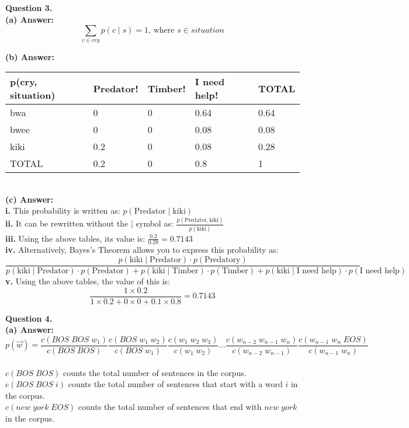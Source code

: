 \documentclass{article}
\begin{document}
\noindent
\textbf{Question 3.}\\
\textbf{(a) Answer:}\\
$$\sum_{c \in cry}p(c \mid s) = 1\text{, where } s \in situation$$

\noindent
\textbf{(b) Answer:}\\
\begin{tabular}{ |p{2.5cm}||p{2.5cm}|p{2.5cm}|p{2.5cm}||p{2.5cm}|  }
 \hline
 p(cry, situation) & Predator! & Timber! & I need help! & TOTAL\\
 \hline
 \hline
 bwa   & 0   & 0 & 0.64 & 0.64\\
 \hline
 bwee  & 0   & 0 & 0.08 & 0.08\\
 \hline
 kiki  & 0.2 & 0 & 0.08 & 0.28\\
 \hline
 \hline
 TOTAL & 0.2 & 0 & 0.8 & 1\\
 \hline
\end{tabular}
\\

\noindent
\textbf{(c) Answer:}\\
\textbf{i.} This probability is written as: $p(\text{Predator} \mid \text{kiki})$\\
\textbf{ii.} It can be rewritten without the $\mid$ symbol as: $\frac{p(\text{Predator}, \text{kiki})}{p(\text{kiki})}$\\
\textbf{iii.} Using the above tables, its value is: $\frac{0.2}{0.28} = 0.7143$\\
\textbf{iv.} Alternatively, Bayes's Theorem allows you to express this probability as:\\
$$\frac{p(\text{kiki} \mid \text{Predator}) \cdot p(\text{Predatory})}{p(\text{kiki} \mid \text{Predator}) \cdot p(\text{Predator}) + p(\text{kiki} \mid \text{Timber}) \cdot p(\text{Timber}) + p(\text{kiki} \mid \text{I need help}) \cdot p(\text{I need help})}$$
\textbf{v.} Using the above tables, the value of this is:\\
$$\frac{1 \times 0.2}{1 \times 0.2 + 0 \times 0 + 0.1 \times 0.8} = 0.7143$$

\noindent
\textbf{Question 4.}\\
\textbf{(a) Answer:}\\
$$p(\vec{w}) = \frac{c(BOS\;BOS\; w_1)}{c(BOS\;BOS)}\frac{c(BOS\;w_1\;w_2)}{c(BOS\;w_1)}\frac{c(w_1\;w_2\; w_3)}{c(w_1\;w_2)}...\frac{c(w_{n-2}\;w_{n-1}\;w_n)}{c(w_{n-2}\;w_{n-1})}\frac{c(w_{n-1}\;w_n\;EOS)}{c(w_{n-1}\;w_n)}$$\\

\noindent
$c(BOS\;BOS)$ counts the total number of sentences in the corpus.\\
$c(BOS\;BOS\;i)$ counts the total number of sentences that start with a word $i$ in the corpus.\\
$c(new\;york\;EOS)$ counts the total number of sentences that end with $new \;york$ in the corpus.\\
\end{document}
